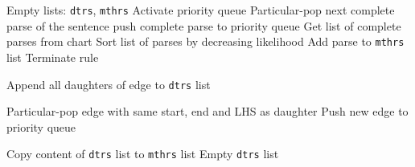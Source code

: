 \documentclass[11pt, titlepage, a4paper]{scrartcl}		%
\newcommand{\XMas}[1]{Alt-Search#1}
\begin{document}
\begin{algorithm}
\caption{\XMas{} Rule}
\label{alg:alt:rule}
\begin{algorithmic}[1]
\REQUIRE Empty lists: \texttt{dtrs}, \texttt{mthrs}
\STATE Activate priority queue \label{alg:alt:rule:activate}
\STATE Particular-pop next complete parse of the sentence  \label{alg:alt:rule:altparse:start}
    \STATE push complete parse to priority queue  \label{alg:alt:rule:altparse:end}
    \STATE Get list of complete parses from chart  \label{alg:alt:rule:s-dtrs}
    \STATE Sort list of parses by decreasing likelihood
        \STATE Add parse to \texttt{mthrs} list
                \STATE Terminate rule
            \ENDIF
        
                \STATE Append all daughters of edge to \texttt{dtrs} list
            \ENDFOR
            
                \REPEAT
                    \STATE Particular-pop edge with same start, end and LHS as daughter
                    \STATE Push new edge to priority queue    
            \ENDFOR
            
            \STATE Copy content of \texttt{dtrs} list to \texttt{mthrs} list
            \STATE Empty \texttt{dtrs} list
        \ENDWHILE
    \ENDFOR
\ENDIF
\end{algorithmic}
\end{algorithm}
\end{document}

